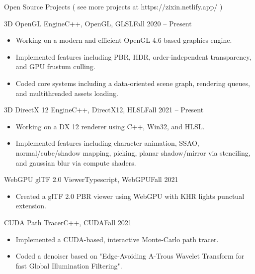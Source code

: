\documentclass[]{mcdowellcv}
\begin{document}
	\begin{cvsection}{Open Source Projects ( see more projects at https://zixin.netlify.app/ )}
		\begin{cvsubsection}{3D OpenGL Engine}{C++, OpenGL, GLSL}{Fall 2020 -- Present}	
			\begin{itemize}
				\item Working on a modern and efficient OpenGL 4.6 based graphics engine.
				\item Implemented features including PBR, HDR, order-independent transparency, and GPU frustum culling. 
				\item Coded core systems including a data-oriented scene graph, rendering queues, and multithreaded assets loading.
			\end{itemize}
		\end{cvsubsection}

		\begin{cvsubsection}{3D DirectX 12 Engine}{C++, DirectX12, HLSL}{Fall 2021 -- Present}		
			\begin{itemize}
				\item Working on a DX 12 renderer using C++, Win32, and HLSL.
				\item Implemented features including character animation, SSAO, normal/cube/shadow mapping, picking, planar shadow/mirror via stenciling, and gaussian blur via compute shaders.
			\end{itemize}
		\end{cvsubsection}

		\begin{cvsubsection}{WebGPU glTF 2.0 Viewer}{Typescript, WebGPU}{Fall 2021}
			\begin{itemize}
				\item Created a glTF 2.0 PBR viewer using WebGPU with KHR lights punctual extension. 
			\end{itemize}
		\end{cvsubsection}

		\begin{cvsubsection}{CUDA Path Tracer}{C++, CUDA}{Fall 2021}	
			\begin{itemize}
				\item Implemented a CUDA-based, interactive Monte-Carlo path tracer. 
				\item Coded a denoiser based on "Edge-Avoiding A-Trous Wavelet Transform for fast Global Illumination Filtering". 
			\end{itemize}
		\end{cvsubsection}
		
	\end{cvsection}
	
\end{document}
